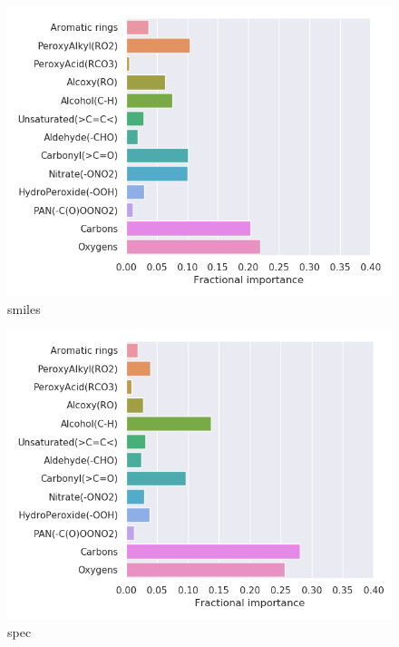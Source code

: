 \begin{subfigure}[b]{0.46\textwidth}
    \centering
    \includegraphics[width=\textwidth]{outputs/t-SNE/smiles/legend.png}
    \caption{smiles}
    \label{fig:legend_t-SNE_smiles}
\end{subfigure}
\begin{subfigure}[b]{0.46\textwidth}
    \centering
    \includegraphics[width=\textwidth]{outputs/t-SNE/spec/legend.png}
    \caption{spec}
    \label{fig:legend_t-SNE_spec}
\end{subfigure}
